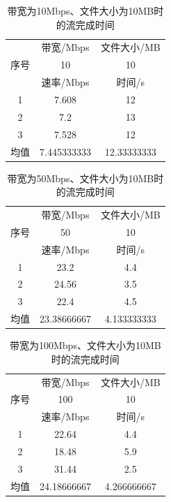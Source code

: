 \documentclass[UTF8]{article}
\begin{document}
\begin{table}[H]
  \centering
  \caption{带宽为10Mbps、文件大小为10MB时的流完成时间}
  \begin{tabular}{|c|c|c|}
    \hline
    \multirow{3}{*}{序号}&带宽/Mbps&文件大小/MB\\
    \cline{2-3}
    &10&10\\
    \cline{2-3}
    &速率/Mbps&时间/s\\
    \hline
    1&7.608&12\\
    \hline
    2&7.2&13\\
    \hline
    3&7.528&12\\
    \hline
    均值&7.445333333&12.33333333\\
    \hline
  \end{tabular}
\end{table}

\begin{table}
  \centering
  \caption{带宽为50Mbps、文件大小为10MB时的流完成时间}
  \begin{tabular}{|c|c|c|}
    \hline
    \multirow{3}{*}{序号}&带宽/Mbps&文件大小/MB\\
    \cline{2-3}
    &50&10\\
    \cline{2-3}
    &速率/Mbps&时间/s\\
    \hline
    1&23.2&4.4\\
    \hline
    2&24.56&3.5\\
    \hline
    3&22.4&4.5\\
    \hline
    均值&23.38666667&4.133333333\\
    \hline
  \end{tabular}
\end{table}

\begin{table}[H]
  \centering
  \caption{带宽为100Mbps、文件大小为10MB时的流完成时间}
  \begin{tabular}{|c|c|c|}
    \hline
    \multirow{3}{*}{序号}&带宽/Mbps&文件大小/MB\\
    \cline{2-3}
    &100&10\\
    \cline{2-3}
    &速率/Mbps&时间/s\\
    \hline
    1&22.64&4.4\\
    \hline
    2&18.48&5.9\\
    \hline
    3&31.44&2.5\\
    \hline
    均值&24.18666667&4.266666667\\
    \hline
  \end{tabular}
\end{table}
\end{document}
